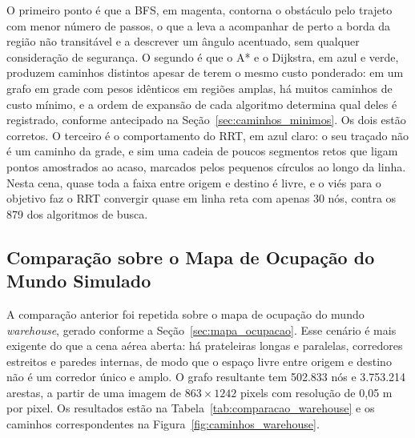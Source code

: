 \documentclass[
    12pt,
    openright,
    oneside,
    a4paper,
    english,
    brazil
]{abntex2}
\begin{document}
O primeiro ponto é que a BFS, em magenta, contorna o obstáculo pelo trajeto com menor número de passos, o que a leva a acompanhar de perto a borda da região não transitável e a descrever um ângulo acentuado, sem qualquer consideração de segurança. O segundo é que o A* e o Dijkstra, em azul e verde, produzem caminhos distintos apesar de terem o mesmo custo ponderado: em um grafo em grade com pesos idênticos em regiões amplas, há muitos caminhos de custo mínimo, e a ordem de expansão de cada algoritmo determina qual deles é registrado, conforme antecipado na Seção~\ref{sec:caminhos_minimos}. Os dois estão corretos. O terceiro é o comportamento do RRT, em azul claro: o seu traçado não é um caminho da grade, e sim uma cadeia de poucos segmentos retos que ligam pontos amostrados ao acaso, marcados pelos pequenos círculos ao longo da linha. Nesta cena, quase toda a faixa entre origem e destino é livre, e o viés para o objetivo faz o RRT convergir quase em linha reta com apenas 30 nós, contra os 879 dos algoritmos de busca.

\subsection{Comparação sobre o Mapa de Ocupação do Mundo Simulado}

A comparação anterior foi repetida sobre o mapa de ocupação do mundo \textit{warehouse}, gerado conforme a Seção~\ref{sec:mapa_ocupacao}. Esse cenário é mais exigente do que a cena aérea aberta: há prateleiras longas e paralelas, corredores estreitos e paredes internas, de modo que o espaço livre entre origem e destino não é um corredor único e amplo. O grafo resultante tem 502.833 nós e 3.753.214 arestas, a partir de uma imagem de $863 \times 1242$ pixels com resolução de 0,05 m por pixel. Os resultados estão na Tabela~\ref{tab:comparacao_warehouse} e os caminhos correspondentes na Figura~\ref{fig:caminhos_warehouse}.
\end{document}
